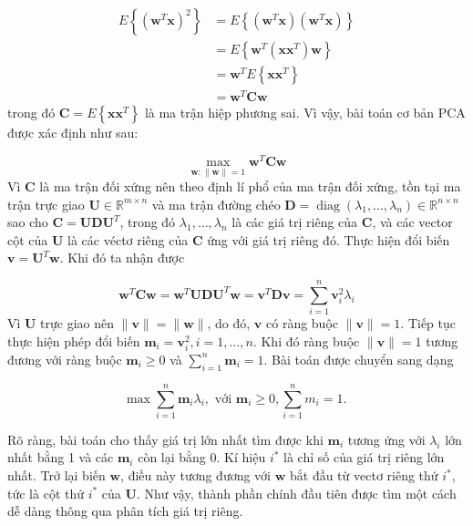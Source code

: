 \documentclass[12pt,a4paper,oneside]{report}
\numberwithin{equation}{section}
\begin{document}
$$
\begin{aligned}
	E\left\{\left(\mathbf{w}^{T} \mathbf{x}\right)^{2}\right\}&=E\left\{\left(\mathbf{w}^{T} \mathbf{x}\right)\left(\mathbf{w}^{T} \mathbf{x}\right)\right\}\\
	 &=E\left\{\mathbf{w}^{T}\left(\mathbf{x} \mathbf{x}^{T}\right) \mathbf{w}\right\}\\
	 & =\mathbf{w}^{T} E\left\{\mathbf{x} \mathbf{x}^{T}\right\} \\
	& =\mathbf{w}^{T} \mathbf{C} \mathbf{w}
\end{aligned}
$$
trong đó $\mathbf{C}=E\left\{\mathbf{x} \mathbf{x}^{T}\right\}$ là ma trận hiệp phương sai. Vì vậy, bài toán cơ bản $\mathrm{PCA}$ được xác định như sau:

$$
\max _{\mathbf{w}:\|\mathbf{w}\|=1} \mathbf{w}^{T}\mathbf{Cw}
$$
Vì $\mathbf{C}$ là ma trận đối xứng nên theo định lí phổ của ma trận đối xứng, tồn tại ma trận trực giao $\mathbf{U} \in \mathbb{R}^{m \times n}$ và ma trận đường chéo $\mathbf{D}=\operatorname{diag}\left(\lambda_{1}, \ldots, \lambda_{n}\right) \in \mathbb{R}^{n \times n}$ sao cho $\mathbf{C} = \mathbf{U} \mathbf{D} \mathbf{ U}^{T}$, trong đó $\lambda_{1}, \ldots, \lambda_{n}$ là các giá trị riêng của $\mathbf{C}$, và các vector cột của $\mathbf{U}$ là các véctơ riêng của $\mathbf{C}$ ứng với giá trị riêng đó. Thực hiện đổi biến $\mathbf{v}=\mathbf{U}^{T} \mathbf{w}$. Khi đó ta nhận được

$$
\mathbf{w}^{T} \mathbf{C} \mathbf{w}=\mathbf{w}^{T} \mathbf{U} \mathbf{D} \mathbf{U}^{T} \mathbf{w}=\mathbf{v}^{T} \mathbf{D} \mathbf{v}=\sum_{i=1}^{n} \mathbf{v}_{i}^{2} \lambda_{i}
$$
Vì $\mathbf{U}$ trực giao nên $\|\mathbf{v}\|=\|\mathbf{w}\|$, do đó, $\mathbf{v}$ có ràng buộc $\|\mathbf{v}\|=1$. Tiếp tục thực hiện phép đổi biến $\mathbf{m}_{i}=\mathbf{v}_{i}^{2}, i=1, \ldots, n$. Khi đó ràng buộc $\|\mathbf{v}\|=1$ tương đương với ràng buộc $\mathbf{m}_{i} \geq 0$ và $\sum_{i=1}^{n} \mathbf{m}_{i}=1$. Bài toán được chuyển sang dạng

$$
\max \sum_{i=1}^{n} \mathbf{m}_{i} \lambda_{i}, \text { với } \mathbf{m}_{i} \geq 0, \sum_{i=1}^{n} m_{i}=1 \text {. }
$$

Rõ ràng, bài toán cho thấy giá trị lớn nhất tìm được khi $\mathbf{m}_{i}$ tương ứng với $\lambda_{i}$ lớn nhất bằng 1 và các $\mathbf{m}_{i}$ còn lại bằng 0. Kí hiệu $i^{*}$ là chỉ số của giá trị riêng lớn nhất. Trở lại biến $\mathbf{w}$, điều này tương đương với $\mathbf{w}$ bắt đầu từ vectơ riêng thứ $i^{*}$, tức là cột thứ $i^{*}$ của $\mathbf{U}$. Như vậy, thành phần chính đầu tiên được tìm một cách dễ dàng thông qua phân tích giá trị riêng.
\end{document}
